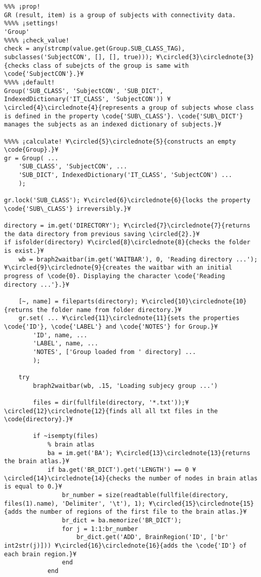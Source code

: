 \documentclass{tufte-handout}
\begin{document}
\begin{lstlisting}
%%% ¡prop!
GR (result, item) is a group of subjects with connectivity data.
%%%% ¡settings!
'Group'
%%%% ¡check_value!
check = any(strcmp(value.get(Group.SUB_CLASS_TAG), subclasses('SubjectCON', [], [], true))); ¥\circled{3}\circlednote{3}{checks class of subejcts of the group is same with \code{'SubjectCON'}.}¥
%%%% ¡default!
Group('SUB_CLASS', 'SubjectCON', 'SUB_DICT', IndexedDictionary('IT_CLASS', 'SubjectCON')) ¥\circled{4}\circlednote{4}{represents a group of subjects whose class is defined in the property \code{'SUB\_CLASS'}. \code{'SUB\_DICT'} manages the subjects as an indexed dictionary of subjects.}¥

%%%% ¡calculate! ¥\circled{5}\circlednote{5}{constructs an empty \code{Group}.}¥
gr = Group( ...
    'SUB_CLASS', 'SubjectCON', ...
    'SUB_DICT', IndexedDictionary('IT_CLASS', 'SubjectCON') ...
    );

gr.lock('SUB_CLASS'); ¥\circled{6}\circlednote{6}{locks the property \code{'SUB\_CLASS'} irreversibly.}¥

directory = im.get('DIRECTORY'); ¥\circled{7}\circlednote{7}{returns the data directory from previous saving \circled{2}.}¥
if isfolder(directory) ¥\circled{8}\circlednote{8}{checks the folder is exist.}¥
    wb = braph2waitbar(im.get('WAITBAR'), 0, 'Reading directory ...'); ¥\circled{9}\circlednote{9}{creates the waitbar with an initial progress of \code{0}. Displaying the character \code{'Reading directory ...'}.}¥
    
    [~, name] = fileparts(directory); ¥\circled{10}\circlednote{10}{returns the folder name from folder directory.}¥
    gr.set( ... ¥\circled{11}\circlednote{11}{sets the properties \code{'ID'}, \code{'LABEL'} and \code{'NOTES'} for Group.}¥
        'ID', name, ...
        'LABEL', name, ...
        'NOTES', ['Group loaded from ' directory] ...
        );

    try
        braph2waitbar(wb, .15, 'Loading subjecy group ...')

        files = dir(fullfile(directory, '*.txt'));¥\circled{12}\circlednote{12}{finds all all txt files in the \code{directory}.}¥

        if ~isempty(files) 
            % brain atlas
            ba = im.get('BA'); ¥\circled{13}\circlednote{13}{returns the brain atlas.}¥
            if ba.get('BR_DICT').get('LENGTH') == 0 ¥\circled{14}\circlednote{14}{checks the number of nodes in brain atlas is equal to 0.}¥
                br_number = size(readtable(fullfile(directory, files(1).name), 'Delimiter', '\t'), 1); ¥\circled{15}\circlednote{15}{adds the number of regions of the first file to the brain atlas.}¥
                br_dict = ba.memorize('BR_DICT');
                for j = 1:1:br_number
                    br_dict.get('ADD', BrainRegion('ID', ['br' int2str(j)])) ¥\circled{16}\circlednote{16}{adds the \code{'ID'} of each brain region.}¥
                end
            end


\end{lstlisting}
\end{document}
